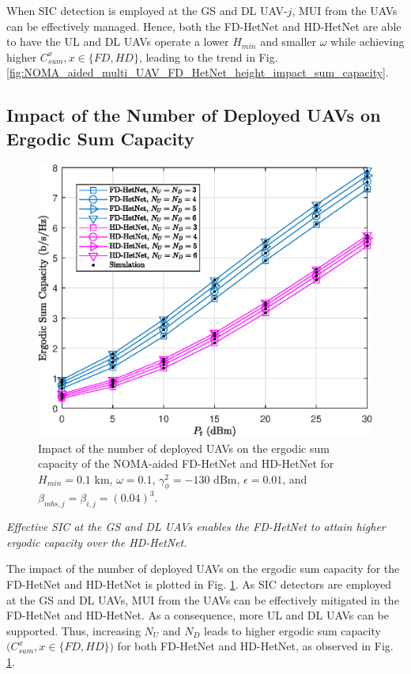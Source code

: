 When SIC detection is employed at the GS and DL UAV-$j$, MUI from the UAVs can be effectively managed. Hence, both the FD-HetNet and HD-HetNet are able to have the UL and DL UAVs operate a lower $H_{min}$ and smaller $\omega$ while achieving higher $C_{sum}^{x}, x \in \{FD, HD\}$, leading to the trend in Fig. \ref{fig:NOMA_aided_multi_UAV_FD_HetNet_height_impact_sum_capacity}.


\subsection{Impact of the Number of Deployed UAVs on Ergodic Sum Capacity}

\begin{figure}[h]
\centering \vspace{0.1cm}
\includegraphics [width=0.45\columnwidth]{chap7_fig/number_deployed_UAVs_sum_capacity.eps}
\caption{Impact of the number of deployed UAVs on the ergodic sum capacity of the NOMA-aided FD-HetNet and HD-HetNet for $H_{min} = 0.1$ km, $\omega = 0.1$, $\gamma_{\phi}^2 = -130\text{ dBm}$, $\epsilon = 0.01$, and $\beta_{mbs,j} = \beta_{i,j} = (0.04)^3$.}
\label{fig:NOMA_aided_multi_UAV_FD_HetNet_number_deployed_UAVs_sum_capacity}
\end{figure}

\begin{observation}
\emph{\emph{Effective SIC at the GS and DL UAVs enables the FD-HetNet to attain higher ergodic capacity over the HD-HetNet.}}
\end{observation}

The impact of the number of deployed UAVs on the ergodic sum capacity for the FD-HetNet and HD-HetNet is plotted in Fig. \ref{fig:NOMA_aided_multi_UAV_FD_HetNet_number_deployed_UAVs_sum_capacity}. As SIC detectors are employed at the GS and DL UAVs, MUI from the UAVs can be effectively mitigated in the FD-HetNet and HD-HetNet. As a consequence, more UL and DL UAVs can be supported. Thus, increasing $N_U$ and $N_D$ leads to higher ergodic sum capacity $\big(C_{sum}^{x}, x \in \{FD, HD\}\big)$ for both FD-HetNet and HD-HetNet, as observed in Fig. \ref{fig:NOMA_aided_multi_UAV_FD_HetNet_number_deployed_UAVs_sum_capacity}. 

